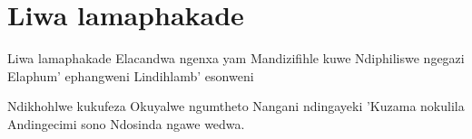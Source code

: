 \starttocol
\chapter{Liwa lamaphakade}
\nexttocol
\hfill{\it }
\stoptocol
\starttocol
\startlines
{\sc Liwa} lamaphakade
Elacandwa ngenxa yam
Mandizifihle kuwe
Ndiphiliswe ngegazi
Elaphum' ephangweni
Lindihlamb' esonweni

Ndikhohlwe kukufeza
Okuyalwe ngumtheto
Nangani ndingayeki
'Kuzama nokulila
Andingecimi sono
Ndosinda ngawe wedwa.

\stoplines
\nexttocol

\stoptocol
